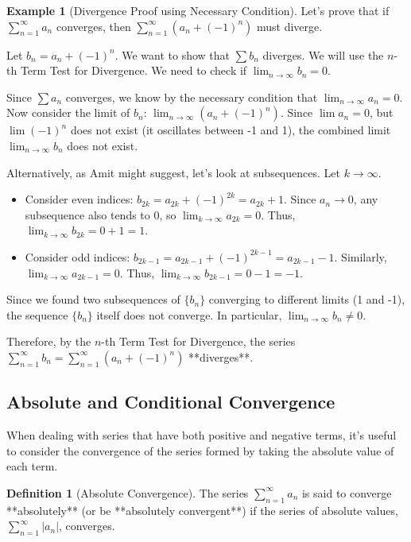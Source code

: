 \documentclass[11pt]{article}
\theoremstyle{definition}
\newtheorem{definition}[theorem]{Definition}
\newtheorem{example}[theorem]{Example}
\theoremstyle{remark}
\begin{document}
\begin{example}[Divergence Proof using Necessary Condition]
Let's prove that if $\sum_{n=1}^{\infty} a_n$ converges, then $\sum_{n=1}^{\infty} (a_n + (-1)^n)$ must diverge.

Let $b_n = a_n + (-1)^n$. We want to show that $\sum b_n$ diverges. We will use the $n$-th Term Test for Divergence. We need to check if $\lim_{n \to \infty} b_n = 0$.

Since $\sum a_n$ converges, we know by the necessary condition that $\lim_{n \to \infty} a_n = 0$.
Now consider the limit of $b_n$: $\lim_{n \to \infty} (a_n + (-1)^n)$.
Since $\lim a_n = 0$, but $\lim (-1)^n$ does not exist (it oscillates between -1 and 1), the combined limit $\lim_{n \to \infty} b_n$ does not exist.

Alternatively, as Amit might suggest, let's look at subsequences.
Let $k \to \infty$.
\begin{itemize}
    \item Consider even indices: $b_{2k} = a_{2k} + (-1)^{2k} = a_{2k} + 1$. Since $a_n \to 0$, any subsequence also tends to 0, so $\lim_{k \to \infty} a_{2k} = 0$. Thus, $\lim_{k \to \infty} b_{2k} = 0 + 1 = 1$.
    \item Consider odd indices: $b_{2k-1} = a_{2k-1} + (-1)^{2k-1} = a_{2k-1} - 1$. Similarly, $\lim_{k \to \infty} a_{2k-1} = 0$. Thus, $\lim_{k \to \infty} b_{2k-1} = 0 - 1 = -1$.
\end{itemize}
Since we found two subsequences of $\{b_n\}$ converging to different limits (1 and -1), the sequence $\{b_n\}$ itself does not converge. In particular, $\lim_{n \to \infty} b_n \neq 0$.

Therefore, by the $n$-th Term Test for Divergence, the series $\sum_{n=1}^{\infty} b_n = \sum_{n=1}^{\infty} (a_n + (-1)^n)$ **diverges**.
\end{example}


\subsection{Absolute and Conditional Convergence}

When dealing with series that have both positive and negative terms, it's useful to consider the convergence of the series formed by taking the absolute value of each term.

\begin{definition}[Absolute Convergence]
The series $\sum_{n=1}^{\infty} a_n$ is said to converge **absolutely** (or be **absolutely convergent**) if the series of absolute values, $\sum_{n=1}^{\infty} |a_n|$, converges.
\end{definition}
\end{document}
